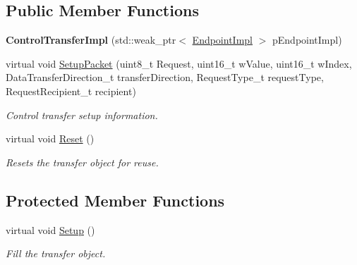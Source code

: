 \subsection*{Public Member Functions}
\begin{DoxyCompactItemize}
\item 
\hypertarget{class_lib_u_s_b_1_1_control_transfer_impl_aa88e9346e7ae3455920d9d1ede6fbeab}{{\bfseries Control\-Transfer\-Impl} (std\-::weak\-\_\-ptr$<$ \hyperlink{class_lib_u_s_b_1_1_endpoint_impl}{Endpoint\-Impl} $>$ p\-Endpoint\-Impl)}\label{class_lib_u_s_b_1_1_control_transfer_impl_aa88e9346e7ae3455920d9d1ede6fbeab}

\item 
virtual void \hyperlink{class_lib_u_s_b_1_1_control_transfer_impl_a9a432ff31e5d9037c04457648438c09c}{Setup\-Packet} (uint8\-\_\-t Request, uint16\-\_\-t w\-Value, uint16\-\_\-t w\-Index, Data\-Transfer\-Direction\-\_\-t transfer\-Direction, Request\-Type\-\_\-t request\-Type, Request\-Recipient\-\_\-t recipient)
\begin{DoxyCompactList}\small\item\em Control transfer setup information. \end{DoxyCompactList}\item 
virtual void \hyperlink{class_lib_u_s_b_1_1_control_transfer_impl_afddcd98639f00b9f68eeb1ae7b2f69ca}{Reset} ()
\begin{DoxyCompactList}\small\item\em Resets the transfer object for reuse. \end{DoxyCompactList}\end{DoxyCompactItemize}
\subsection*{Protected Member Functions}
\begin{DoxyCompactItemize}
\item 
\hypertarget{class_lib_u_s_b_1_1_control_transfer_impl_aacf8440e1d6ca1c97f1cc9143a1b01a6}{virtual void \hyperlink{class_lib_u_s_b_1_1_control_transfer_impl_aacf8440e1d6ca1c97f1cc9143a1b01a6}{Setup} ()}\label{class_lib_u_s_b_1_1_control_transfer_impl_aacf8440e1d6ca1c97f1cc9143a1b01a6}

\begin{DoxyCompactList}\small\item\em Fill the transfer object. \end{DoxyCompactList}\end{DoxyCompactItemize}
